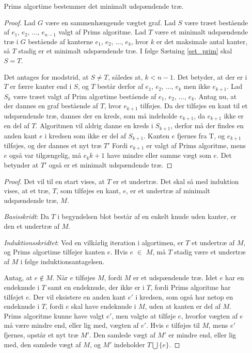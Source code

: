 \begin{thm}
Prims algortime bestemmer det minimalt udspændende træ. 
\label{set_prim}
\end{thm}

\begin{proof}
Lad $G$ være en sammenhængende vægtet graf. Lad $S$ være træet bestående af $e_1$, $e_2$, $\ldots$, $e_{n-1}$ valgt af Prims algoritme. Lad $T$ være et minimalt udspændende træ i $G$ bestående af kanterne $e_1$, $e_2$, $\ldots$, $e_k$, hvor $k$ er det maksimale antal kanter, så $T$ stadig er et minimalt udspændende træ. I følge Sætning \ref{set_prim} skal $S=T$. 

Det antages for modstrid, at $S \neq T$, således at, $k<n-1$. Det betyder, at der er i $T$ er færre kanter end i $S$, og $T$ består derfor af $e_1$, $e_2$, $\ldots$, $e_k$ men ikke $e_{k+1}$. 
Lad $S_k$ være træet valgt af Prim algortime bestående af $e_1$, $e_2$, $\ldots$, $e_k$. Antag nu, at der dannes en graf bestående af $T$, hvor $e_{k+1}$ tilføjes. 
Da der tilføjes en kant til et udspændende træ, dannes der en kreds, som må indeholde $e_{k+1}$, da $e_{k+1}$ ikke er en del af $T$. 
Algoritmen vil aldrig danne en kreds i $S_{k+1}$, derfor må der findes en anden kant $e$ i kredsen som ikke er del af $S_{k+1}$.
Kanten $e$ fjernes fra T, og $e_{k+1}$ tilføjes, og der dannes et nyt træ $T'$  
Fordi $e_{k+1}$ er valgt af Prims algoritme, mens $e$ også var tilgængelig, må $e_k{k+1}$ have mindre eller samme vægt som $e$. 
Det betynder at $T'$ også er et minimalt udspændende træ. 

 
\end{proof}

\begin{proof}
Det vil til en start vises, at $T$ er et undertræ. Det skal så med induktion vises, at et træ, $T$, som tilføjes en kant, $e$, er et undertræ af minimalt udspændende træ, $M$. 

\textit{Basisskridt}: Da $T$ i begyndelsen blot består af en enkelt knude uden kanter, er den et undertræ af $M$.

\textit{Induktionsskridtet}: Ved en vilkårlig iteration i algortimen, er $T$ et undertræ af $M$, og Prims algortime tilføjer kanten $e$. Hvis $e$ $\in$ $M$, må $T$ stadig være et undertræ af $M$ i følge induktionsantagelsen.

Antag, at $e \notin M$. Når $e$ tilføjes $M$, fordi $M$ er et udspændende træ. Idet $e$ har en endeknude i $T$ samt en endeknude, der ikke er i $T$, fordi Prims algoritme har tilføjet $e$. Der vil eksistere en anden kant $e'$ i kredsen, som også har netop en endeknude i $T$, fordi $e$ skal have endeknude i $M$, uden at kanten er del af $M$. Prims algoritme kunne have valgt $e'$, men valgte at tilføje $e$, hvorfor vægten af $e$ må være mindre end, eller lig med, vægten af $e'$. Hvis $e$ tilføjes til $M$, mens $e'$ fjernes, opstår et nyt træ $M'$.  Den samlede vægt af $M'$ er mindre end, eller lig med, den samlede vægt af $M$, og $M'$ indeholder $T\bigcup \lbrace e \rbrace$.

\end{proof}

